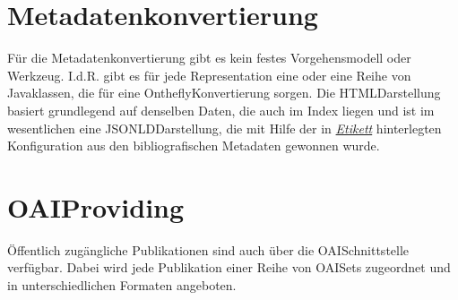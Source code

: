 \documentclass[letterpaper,10pt,english]{sphinxmanual}
\begin{document}
\section{Metadatenkonvertierung}
\label{\detokenize{toscience:metadatenkonvertierung}}\label{\detokenize{toscience:id9}}
\sphinxAtStartPar
Für die Metadatenkonvertierung gibt es kein festes Vorgehensmodell oder
Werkzeug. I.d.R. gibt es für jede Representation eine oder eine Reihe
von Javaklassen, die für eine On\sphinxhyphen{}the\sphinxhyphen{}fly\sphinxhyphen{}Konvertierung sorgen. Die
HTML\sphinxhyphen{}Darstellung basiert grundlegend auf denselben Daten, die auch im
\sphinxhyphen{}Index liegen
und ist im wesentlichen eine JSON\sphinxhyphen{}LD\sphinxhyphen{}Darstellung, die mit Hilfe der in
{\hyperref[\detokenize{toscience:_etikett}]{\emph{Etikett}}} hinterlegten Konfiguration aus den
bibliografischen Metadaten gewonnen wurde.


\section{OAI\sphinxhyphen{}Providing}
\label{\detokenize{toscience:oai-providing}}\label{\detokenize{toscience:id10}}
\sphinxAtStartPar
Öffentlich zugängliche Publikationen sind auch über die
OAI\sphinxhyphen{}Schnittstelle verfügbar. Dabei wird jede Publikation einer Reihe von
OAI\sphinxhyphen{}Sets zugeordnet und in unterschiedlichen Formaten angeboten.
\end{document}
